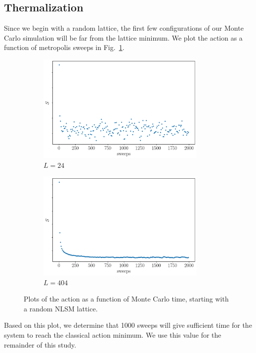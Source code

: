 \subsection{Thermalization}
\label{sec:thermalization}
Since we begin with a random lattice, the first few configurations of our Monte Carlo simulation will be far from the lattice minimum. We plot the action as a function of metropolis sweeps in Fig.~\ref{fig:therm}.
\begin{figure}[h]
  \centering
      \begin{subfigure}[b]{0.5\textwidth}\centering
        \includegraphics[width=0.9\textwidth]{imgs/therm24.png}
        \caption{$L=24$}
      \end{subfigure}%
      \hfill
      \begin{subfigure}[b]{0.5\textwidth}\centering
        \includegraphics[width=0.9\textwidth]{imgs/therm404.png}
        \caption{$L=404$}
      \end{subfigure}
      \hfill
      \caption{\label{fig:therm} Plots of the action as a function of Monte Carlo time, starting with a random NLSM lattice.}
\end{figure}
Based on this plot, we determine that 1000 sweeps will give sufficient time for the system to reach the classical action minimum. We use this value for the remainder of this study.
